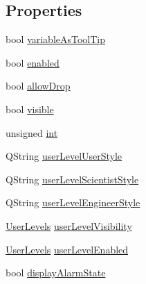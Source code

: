 \subsection*{Properties}
\begin{DoxyCompactItemize}
\item 
bool \hyperlink{classQEFrame_a1cb1946dc64c08ab7eb87c8214630a7c}{variableAsToolTip}
\item 
bool \hyperlink{classQEFrame_ad2c8724a8455c554dd24fc833e8f5ff7}{enabled}
\item 
bool \hyperlink{classQEFrame_aa50e5751ece0e089a124bc2c16270e7a}{allowDrop}
\item 
bool \hyperlink{classQEFrame_a42b6f201a511f9a3b87e2474c16c0f5b}{visible}
\item 
unsigned \hyperlink{classQEFrame_a3fdb2e6df61c380f5dbae9c0d4fe2c97}{int}
\item 
QString \hyperlink{classQEFrame_a71f5eed86516183bed1d51189e954bdc}{userLevelUserStyle}
\item 
QString \hyperlink{classQEFrame_a9de22693918199d7eb8ee743ecae1110}{userLevelScientistStyle}
\item 
QString \hyperlink{classQEFrame_ade723579d535f116cf0611d001c7bfb3}{userLevelEngineerStyle}
\item 
\hyperlink{classQEFrame_a7f512f888a2a6f46631a382597090503}{UserLevels} \hyperlink{classQEFrame_af6b93bbb318228dd8debf550d8e35bd0}{userLevelVisibility}
\item 
\hyperlink{classQEFrame_a7f512f888a2a6f46631a382597090503}{UserLevels} \hyperlink{classQEFrame_af3d7163c6158e457d081c5de695bd064}{userLevelEnabled}
\item 
bool \hyperlink{classQEFrame_ab5c6eeebcdacc6101b7082c3ff89d84b}{displayAlarmState}
\end{DoxyCompactItemize}


